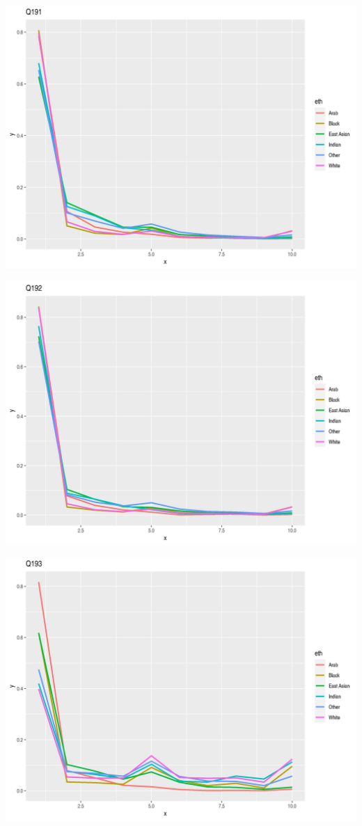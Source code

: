 \documentclass{amsart}
\begin{document}
\includegraphics[scale=0.7]{q191.jpeg}

\includegraphics[scale=0.7]{q192.jpeg}

\includegraphics[scale=0.7]{q193.jpeg}
\end{document}
